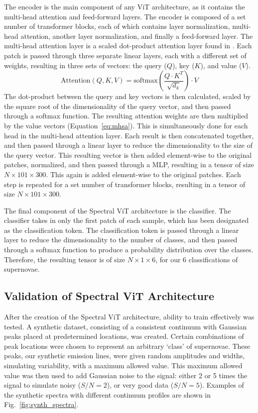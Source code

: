 The encoder is the main component of any ViT architecture, as it contains the 
multi-head attention and feed-forward layers. The encoder is composed of a set number of
transformer blocks, each of which contains layer normalization, multi-head attention, another 
layer normalization, and finally a feed-forward layer. The multi-head attention layer 
is a scaled dot-product attention layer found in \textcite{vaswani2017}. Each patch 
is passed through three separate linear layers, each with a different set of weights, 
resulting in three sets of vectors: the query ($Q$), key ($K$), and value ($V$).
\begin{equation}
    \label{eq:mhsa}
    \text{Attention}(Q, K, V) = \text{softmax}\left(\frac{Q\cdot K^T}{\sqrt{d_k}}\right)\cdot V
\end{equation}
The dot-product between the query and key vectors is then calculated,
scaled by the square root of the dimensionality of the query vector, and then passed through a softmax function.
The resulting attention weights are then multiplied by the value vectors (Equation~\ref{eq:mhsa}). 
This is simultaneously done for each head in the multi-head attention layer. Each result is then 
concatenated together, and then passed through a linear layer to reduce the dimensionality
to the size of the query vector. This resulting vector is then added
element-wise to the original patches, normalized, and then passed through a MLP, 
resulting in a tensor of size $N \times 101 \times 300$. This again is added element-wise to the original patches. 
Each step is repeated for a set number of transformer blocks, resulting in a tensor of size
$N \times 101 \times 300$.

The final component of the Spectral ViT architecture is the classifier. The classifier
takes in only the first patch of each sample, which has been designated as the classification token.
The classification token is passed through a linear layer to reduce the dimensionality to the
number of classes, and then passed through a softmax function to produce a probability distribution
over the classes. Therefore, the resulting tensor is of size $N \times 1 \times 6$, for our 
6 classifications of supernovae.
\subsection{Validation of Spectral ViT Architecture}
\label{ssec:validation}
After the creation of the Spectral ViT architecture, ability to train effectively 
was tested. A synthetic dataset, consisting of a consistent continuum with 
Gaussian peaks placed at predetermined locations, was created. Certain combinations of 
peak locations were chosen to represent an arbitrary `class' of supernovae. These peaks, 
our synthetic emission lines, were given random amplitudes and widths, simulating  
variability, with a maximum allowed value. This maximum allowed value was then used to add 
Gaussian noise to the signal: either 2 or 5 times the signal to simulate noisy ($S/N=2$),
or very good data ($S/N=5$). Examples of the synthetic spectra with different continuum profiles 
are shown in Fig.~\ref{fig:synth_spectra}. 

